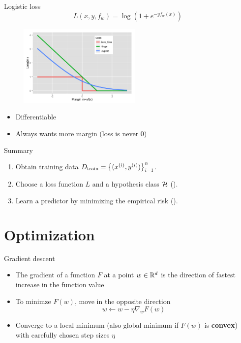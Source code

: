 \documentclass[usenames,dvipsnames,notes,11pt,aspectratio=169]{beamer}
\begin{document}
\begin{frame}
    {Logistic loss}
    $$
    L(x,y,f_w) = \log(1+e^{-yf_w(x)})
    $$
    \begin{figure}
        \includegraphics[height=4cm]{figures/loss.Zero_One.Hinge.Logistic.png}
    \end{figure}
    \begin{itemize}
        \item Differentiable
        \item Always wants more margin (loss is never 0)
    \end{itemize}
\end{frame}

\begin{frame}
    {Summary}
    \begin{enumerate}
        \itemsep2em
        \item Obtain training data $D_{\text{train}}=\left\{ (x^{(i)}, y^{(i)}) \right\}_{i=1}^n$.
        \item Choose a loss function $L$ and a hypothesis class $\mathcal{H}$ ().
        \item Learn a predictor by minimizing the empirical risk ().
    \end{enumerate}
\end{frame}


\section{Optimization}

\begin{frame}
    {Gradient descent}
    \begin{itemize}
        \item The gradient of a function $F$ at a point $w \in \mathbb{R}^d$ is the direction of fastest increase in the function value
        \item To minimze $F(w)$, move in the opposite direction
        $$w \leftarrow w - \eta\nabla_w F(w)$$
        \item Converge to a local minimum (also global minimum if $F(w)$ is \textbf{convex}) with carefully chosen step sizes $\eta$
    \end{itemize}
\end{frame}
\end{document}
